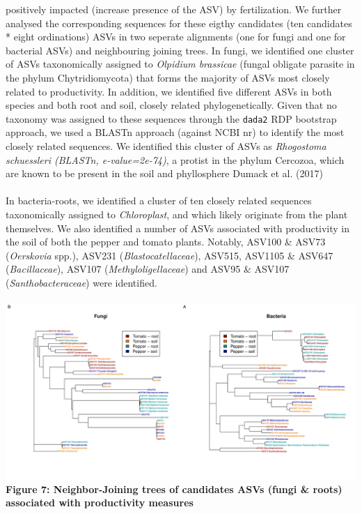 \documentclass[11pt,]{article}
\begin{document}
positively impacted (increase presence of the ASV) by fertilization. We
further analysed the corresponding sequences for these eigthy candidates
(ten candidates * eight ordinations) ASVs in two seperate alignments
(one for fungi and one for bacterial ASVs) and neighbouring joining
trees. In fungi, we identified one cluster of ASVs taxonomically
assigned to \emph{Olpidium brassicae} (fungal obligate parasite in the
phylum Chytridiomycota) that forms the majority of ASVs most closely
related to productivity. In addition, we identified five different ASVs
in both species and both root and soil, closely related
phylogenetically. Given that no taxonomy was assigned to these sequences
through the \texttt{dada2} RDP bootstrap approach, we used a BLASTn
approach (against NCBI nr) to identify the most closely related
sequences. We identified this cluster of ASVs as \emph{Rhogostoma
schuessleri (BLASTn, e-value=2e-74)}, a protist in the phylum Cercozoa,
which are known to be present in the soil and phyllosphere Dumack et al.
(2017)\\
\hspace*{0.333em}\\
In bacteria-roots, we identified a cluster of ten closely related
sequences taxonomically assigned to \emph{Chloroplast}, and which likely
originate from the plant themselves. We also identified a number of ASVs
associated with productivity in the soil of both the pepper and tomato
plants. Notably, ASV100 \& ASV73 (\emph{Oerskovia} spp.), ASV231
(\emph{Blastocatellaceae}), ASV515, ASV1105 \& ASV647
(\emph{Bacillaceae}), ASV107 (\emph{Methyloligellaceae}) and ASV95 \&
ASV107 (\emph{Santhobacteraceae}) were identified. ~\\
\hspace*{0.333em}\\
\includegraphics{../figures/Figure7_candidateASVs.pdf}\\
\textbf{Figure 7: Neighbor-Joining trees of candidates ASVs (fungi \&
roots) associated with productivity measures} ~\\
\hspace*{0.333em}\\
\newpage  
\end{document}
